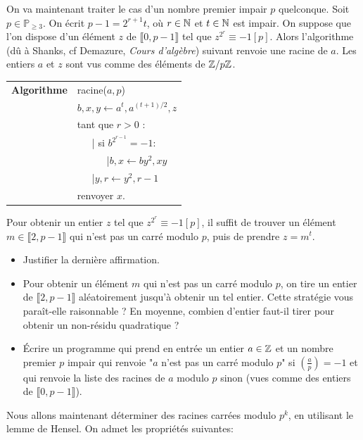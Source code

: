 \documentclass[11pt,a4paper]{article}
\begin{document}
On va maintenant traiter le cas d'un nombre premier impair $p$ quelconque. Soit $p\in \mathbb{P}_{\geq 3}$. On écrit $p-1=2^{r+1}t$, où $r\in \mathbb{N}$ et $t\in \mathbb{N}$ est impair. On suppose que l'on dispose d'un élément $z$ de $\llbracket 0,p-1\rrbracket$ tel que $z^{2^r}\equiv -1[p]$. Alors l'algorithme (dû à Shanks, cf Demazure, \textit{Cours d'algèbre}) suivant renvoie une racine de $a$. Les entiers $a$ et $z$ sont vus comme des éléments de $\mathbb{Z}/p\mathbb{Z}$.

\begin{tabular}{ll}
\textbf{Algorithme } & racine($a,p$)\\
& $b,x,y\leftarrow a^t,a^{(t+1)/2},z$ \\
& tant que $r>0$ :\\
& \ \ \ {\rm |} si $b^{2^{r-1}} =-1$:\\
& \ \ \ \ \ \ {\rm |}$b,x \leftarrow b y^2,xy$\\
& \ \ \ {\rm |}$y,r\leftarrow y^2,r-1$\\
& renvoyer $x$.
\end{tabular}
 
Pour obtenir un entier $z$ tel que $z^{2^r}\equiv -1[p]$, il suffit de trouver un élément $m\in \llbracket 2,p-1\rrbracket$ qui n'est pas un carré modulo $p$, puis de prendre $z=m^t$.

\begin{itemize}
\item[•] Justifier la dernière affirmation.


\item[•] Pour obtenir un élément $m$ qui n'est pas un carré modulo $p$, on tire un entier de $\llbracket 2,p-1\rrbracket$ aléatoirement jusqu'à obtenir un tel entier. Cette stratégie vous paraît-elle raisonnable ? En moyenne, combien d'entier faut-il tirer pour obtenir un non-résidu quadratique ? 

\item[•] Écrire un programme qui prend en entrée un entier $a\in \mathbb{Z}$ et un nombre premier $p$ impair  qui renvoie "$a$ n'est pas un carré modulo $p$" si $\left(\frac{a}{p}\right)=-1$ et qui renvoie la liste des racines de $a$ modulo $p$ sinon (vues comme des entiers de $\llbracket 0,p-1\rrbracket$). 

\end{itemize}


Nous allons maintenant déterminer des racines carrées modulo $p^k$, en utilisant le lemme de Hensel. On  admet les propriétés suivantes:
\end{document}
